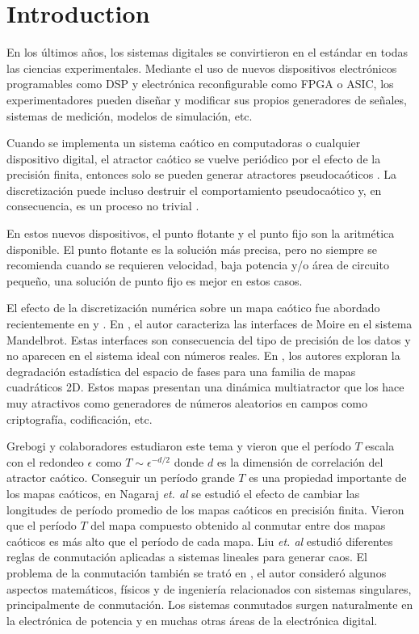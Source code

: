 \section{Introduction}

En los últimos años, los sistemas digitales se convirtieron en el estándar en todas las ciencias experimentales.
Mediante el uso de nuevos dispositivos electrónicos programables como DSP y electrónica reconfigurable como FPGA o ASIC, los experimentadores pueden diseñar y modificar sus propios generadores de señales, sistemas de medición, modelos de simulación, etc.

Cuando se implementa un sistema caótico en computadoras o cualquier dispositivo digital, el atractor caótico se vuelve periódico por el efecto de la precisión finita, entonces solo se pueden generar atractores pseudocaóticos \cite{Alcover2017, Dias2011}.
La discretización puede incluso destruir el comportamiento pseudocaótico y, en consecuencia, es un proceso no trivial \cite{Azzaz2013, Hoover2017, DeMicco2017}.

En estos nuevos dispositivos, el punto flotante y el punto fijo son la aritmética disponible.
El punto flotante es la solución más precisa, pero no siempre se recomienda cuando se requieren velocidad, baja potencia y/o área de circuito pequeño, una solución de punto fijo es mejor en estos casos.

El efecto de la discretización numérica sobre un mapa caótico fue abordado recientemente en \cite{Alcover2017} y \cite{DeMicco2017}.
En \cite{Alcover2017}, el autor caracteriza las interfaces de Moire en el sistema Mandelbrot.
Estas interfaces son consecuencia del tipo de precisión de los datos y no aparecen en el sistema ideal con números reales.
En \cite{DeMicco2017}, los autores exploran la degradación estadística del espacio de fases para una familia de mapas cuadráticos 2D.
Estos mapas presentan una dinámica multiatractor que los hace muy atractivos como generadores de números aleatorios en campos como criptografía, codificación, etc.

Grebogi y colaboradores \cite{Grebogi1988} estudiaron este tema y vieron que el período $T$ escala con el redondeo $\epsilon$ como $T\sim\epsilon^{-d/2}$ donde $d$ es la dimensión de correlación del atractor caótico.
Conseguir un período grande $T$ es una propiedad importante de los mapas caóticos, en \cite{Nagaraj2008} Nagaraj \textit{et. al} se estudió el efecto de cambiar las longitudes de período promedio de los mapas caóticos en precisión finita.
Vieron que el período $T$ del mapa compuesto obtenido al conmutar entre dos mapas caóticos es más alto que el período de cada mapa.
Liu \textit{et. al} \cite{Liu2006} estudió diferentes reglas de conmutación aplicadas a sistemas lineales para generar caos.
El problema de la conmutación también se trató en \cite{Gluskin2008}, el autor consideró algunos aspectos matemáticos, físicos y de ingeniería relacionados con sistemas singulares, principalmente de conmutación.
Los sistemas conmutados surgen naturalmente en la electrónica de potencia y en muchas otras áreas de la electrónica digital.

